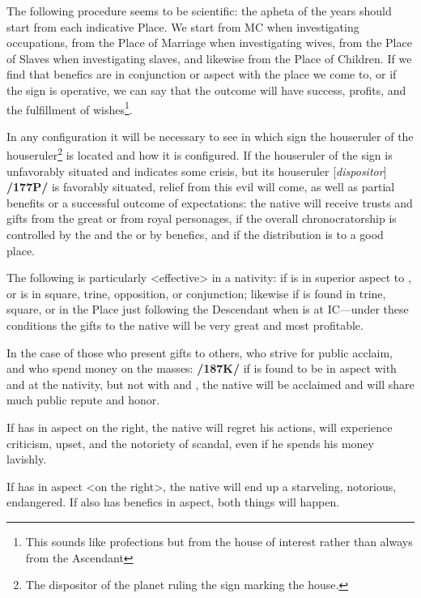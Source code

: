The following procedure seems to be scientific: the apheta of the years should start from each indicative Place. We start from MC when investigating occupations, from the Place of Marriage when investigating wives, from the Place of Slaves when investigating slaves, and likewise from the Place of Children. If we find that benefics are in conjunction or aspect with the place we come to, or if the sign is operative, we can
say that the outcome will have success, profits, and the fulfillment of wishes\footnote{This sounds like profections but from the house of interest rather than always from the Ascendant}.

In any configuration it will be necessary to see in which sign the houseruler of the houseruler\footnote{The dispositor of the planet ruling the sign marking the house.} is located and how it is configured. If the houseruler of the sign is unfavorably situated and indicates some crisis, but its houseruler [\textit{dispositor}] \textbf{/177P/} is favorably situated, relief from this evil will come, as well as partial benefits or a successful outcome of expectations: the native will receive trusts and gifts from the great or from royal personages, if the overall chronocratorship is controlled by the \Sun\xspace and the \Moon\xspace or by benefics, and if the distribution is to a good place. 


The following is particularly <effective> in a nativity: if \Jupiter\xspace is in superior aspect to \Saturn, or is in square, trine, opposition, or conjunction; likewise if \Mars\xspace is found in trine, square, or in the Place just following the Descendant when \Jupiter\xspace is at IC—under these conditions the gifts to the native will be very great and most profitable. 

In the case of those who present gifts to others, who strive for public acclaim, and who spend money on the masses: \textbf{/187K/} if \Mercury\xspace is found to be in aspect with \Jupiter\xspace and \Venus\xspace at the nativity, but not with \Saturn\xspace and \Mars, the native will be acclaimed and will share much public repute and honor. 

If \Mercury\xspace has \Mars\xspace in aspect on the right, the
native will regret his actions, will experience criticism, upset, and the notoriety of scandal, even if he spends his money lavishly. 

If \Mercury\xspace has \Saturn\xspace in aspect <on the right>, the native will end up a starveling, notorious, endangered. If \Mercury\xspace also has benefics in aspect, both things will happen.

